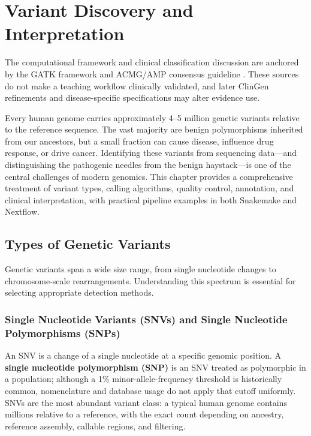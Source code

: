 \chapter{Variant Discovery and Interpretation}
\label{ch:variants}

\begin{sourcebox}
The computational framework and clinical classification discussion are anchored by the GATK framework and ACMG/AMP consensus guideline \cite{depristo2011,richards2015}. These sources do not make a teaching workflow clinically validated, and later ClinGen refinements and disease-specific specifications may alter evidence use.
\end{sourcebox}

Every human genome carries approximately 4--5 million genetic variants relative to the reference sequence. The vast majority are benign polymorphisms inherited from our ancestors, but a small fraction can cause disease, influence drug response, or drive cancer. Identifying these variants from sequencing data---and distinguishing the pathogenic needles from the benign haystack---is one of the central challenges of modern genomics. This chapter provides a comprehensive treatment of variant types, calling algorithms, quality control, annotation, and clinical interpretation, with practical pipeline examples in both Snakemake and Nextflow.

\section{Types of Genetic Variants}
\label{sec:variant_types}

Genetic variants span a wide size range, from single nucleotide changes to chromosome-scale rearrangements. Understanding this spectrum is essential for selecting appropriate detection methods.

\subsection{Single Nucleotide Variants (SNVs) and Single Nucleotide Polymorphisms (SNPs)}

An SNV is a change of a single nucleotide at a specific genomic position. A \textbf{single nucleotide polymorphism (SNP)} is an SNV treated as polymorphic in a population; although a 1\% minor-allele-frequency threshold is historically common, nomenclature and database usage do not apply that cutoff uniformly. SNVs are the most abundant variant class: a typical human genome contains millions relative to a reference, with the exact count depending on ancestry, reference assembly, callable regions, and filtering.

